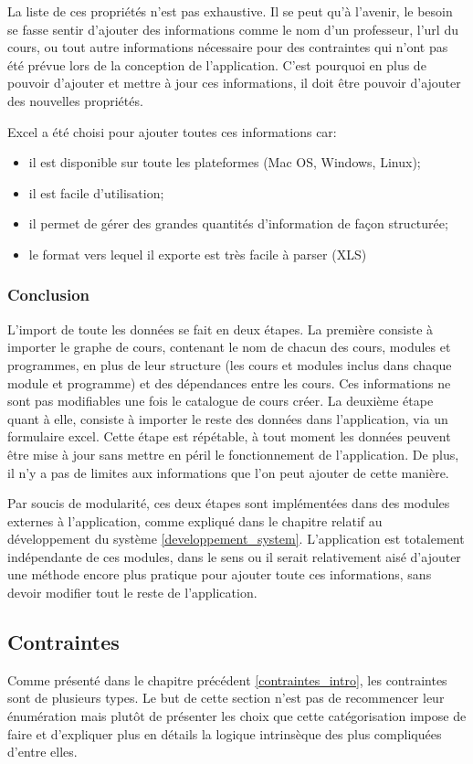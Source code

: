 La liste de ces propriétés n'est pas exhaustive. Il se peut qu'à l'avenir, le besoin se fasse sentir d'ajouter des informations comme le nom d'un professeur, l'url du cours, ou tout autre informations nécessaire pour des contraintes qui n'ont pas été prévue lors de la conception de l'application. C'est pourquoi en plus de pouvoir d'ajouter et mettre à jour ces informations, il doit être pouvoir d'ajouter des nouvelles propriétés.

Excel a été choisi pour ajouter toutes ces informations car:
\begin{itemize}
  \item il est disponible sur toute les plateformes (Mac OS, Windows, Linux);
  \item il est facile d'utilisation;
  \item il permet de gérer des grandes quantités d'information de façon structurée;
  \item le format vers lequel il exporte est très facile à parser (XLS)
\end{itemize}

\subsubsection{Conclusion}
L'import de toute les données se fait en deux étapes. La première consiste à importer le graphe de cours, contenant le nom de chacun des cours, modules et programmes, en plus de leur structure (les cours et modules inclus dans chaque module et programme) et des dépendances entre les cours. Ces informations ne sont pas modifiables une fois le catalogue de cours créer. La deuxième étape quant à elle, consiste à importer le reste des données dans l'application, via un formulaire excel. Cette étape est répétable, à tout moment les données peuvent être mise à jour sans mettre en péril le fonctionnement de l'application. De plus, il n'y a pas de limites aux informations que l'on peut ajouter de cette manière.

Par soucis de modularité, ces deux étapes sont implémentées dans des modules externes à l'application, comme expliqué dans le chapitre relatif au développement du système \ref{developpement_system}. L'application est totalement indépendante de ces modules, dans le sens ou il serait relativement aisé d'ajouter une méthode encore plus pratique pour ajouter toute ces informations, sans devoir modifier tout le reste de l'application.




\subsection{Contraintes}
\label{contraintes}
Comme présenté dans le chapitre précédent \ref{contraintes_intro}, les contraintes sont de plusieurs types. Le but de cette section n'est pas de recommencer leur énumération mais plutôt de présenter les choix que cette catégorisation impose de faire et d'expliquer plus en détails la logique intrinsèque des plus compliquées d'entre elles.    


